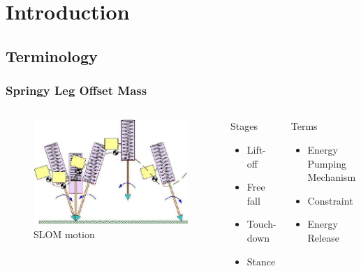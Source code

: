 \section{Introduction}

\subsection*{Terminology}
\begin{frame}
\frametitle{Springy Leg Offset Mass}
\begin{columns}
\begin{figure}
\centering
\includegraphics[width=\textwidth]{fig/SLOM_motion.pdf}
\caption{SLOM motion}
\end{figure}

\begin{block}{Stages}
\begin{itemize}
\item
Lift-off\\[0.1in]
\item
Free fall\\[0.1in]
\item
Touch-down\\[0.1in]
\item
Stance
\end{itemize}
\end{block}
\begin{block}{Terms}
\begin{itemize}
\item
Energy Pumping Mechanism\\[0.1in]
\item
Constraint\\[0.1in]
\item
Energy Release\\[0.1in]
\end{itemize}
\end{block}

\end{columns}
\end{frame}

